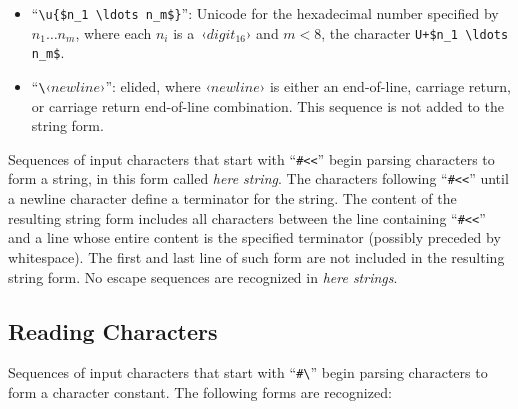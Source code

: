\begin{itemize}
  \item ``\lstinline!\u{$n_1 \ldots n_m$}!'': Unicode for the hexadecimal number specified by $n_1 \ldots n_m$, where each $n_i$ is a~‹$digit_{16}$› and $m < 8$, the character \lstinline!U+$n_1 \ldots n_m$!.
  
  
  \item ``\lstinline!\!‹$newline$›'': elided, where ‹$newline$› is either an end-of-line, carriage return, or carriage return end-of-line combination. This sequence is not added to the string form.
\end{itemize}

Sequences of input characters that start with ``\lstinline!#<<!'' begin parsing characters to form a string, in this form called {\em here string}. The characters following ``\lstinline!#<<!'' until a newline character define a terminator for the string. The content of the resulting string form includes all characters between the line containing ``\lstinline!#<<!'' and a line whose entire content is the specified terminator (possibly preceded by whitespace). The first and last line of such form are not included in the resulting string form. No escape sequences are recognized in {\em here strings}. %





\subsection{Reading Characters}
\label{subsec:aml-base-lang-reader-characters}

Sequences of input characters that start with ``\lstinline!#\!'' begin parsing characters to form a character constant. The following forms are recognized:

